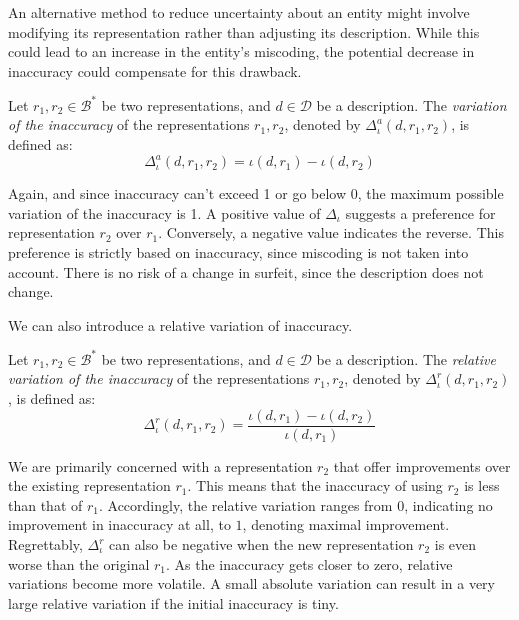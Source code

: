 An alternative method to reduce uncertainty about an entity might involve modifying its representation rather than adjusting its description. While this could lead to an increase in the entity's miscoding, the potential decrease in inaccuracy could compensate for this drawback.

\begin{definition}
Let $r_1, r_2 \in \mathcal{B}^\ast$ be two representations, and $d \in \mathcal{D}$ be a description. The \emph{variation of the inaccuracy} of the representations $r_1, r_2$, denoted by $\Delta^{a} _{\iota} ( d, r_1, r_2 )$, is defined as:
\[
\Delta^{a}_{\iota} ( d, r_1, r_2 ) = \iota(d, r_1) - \iota(d, r_2)
\] 
\end{definition}

Again, and since inaccuracy can't exceed 1 or go below 0, the maximum possible variation of the inaccuracy is 1. A positive value of $\Delta_{\iota}$ suggests a preference for representation $r_2$ over $r_1$. Conversely, a negative value indicates the reverse. This preference is strictly based on inaccuracy, since miscoding is not taken into account. There is no risk of a change in surfeit, since the description does not change.

We can also introduce a relative variation of inaccuracy.

\begin{definition}
Let $r_1, r_2 \in \mathcal{B}^\ast$ be two representations, and $d \in \mathcal{D}$ be a description. The \emph{relative variation of the inaccuracy} of the representations $r_1, r_2$, denoted by $\Delta^{r}_{\iota} ( d, r_1, r_2 )$, is defined as:
\[
\Delta^{r}_{\iota} ( d, r_1, r_2 ) = \frac{\iota(d, r_1) - \iota(d, r_2)}{\iota(d, r_1)}
\] 
\end{definition}

We are primarily concerned with a representation $r_2$ that offer improvements over the existing representation $r_1$. This means that the inaccuracy of using $r_2$ is less than that of $r_1$. Accordingly, the relative variation ranges from $0$, indicating no improvement in inaccuracy at all, to $1$, denoting maximal improvement. Regrettably, $\Delta^{r}_{\iota}$ can also be negative when the new representation $r_2$ is even worse than the original $r_1$. As the inaccuracy gets closer to zero, relative variations become more volatile. A small absolute variation can result in a very large relative variation if the initial inaccuracy is tiny.

%
%

